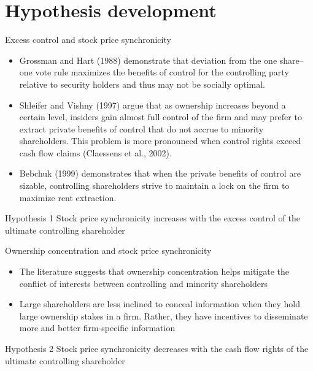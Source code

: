 \documentclass{beamer}
\begin{document}
\section{Hypothesis development}
\begin{frame}{Excess control and stock price synchronicity}
\begin{itemize}
	\scriptsize
	\item Grossman and Hart (1988) demonstrate that deviation from the
	one share–one vote rule maximizes the benefits of control for the
	controlling party relative to security holders and thus may not be
	socially optimal. 
	\item Shleifer and Vishny (1997) argue that as ownership increases beyond a certain level, insiders gain almost full control of the firm and may prefer to extract private benefits of control
	that do not accrue to minority shareholders. This problem is more
	pronounced when control rights exceed cash flow claims
	(Claessens et al., 2002). 
	\item Bebchuk (1999) demonstrates that when
	the private benefits of control are sizable, controlling shareholders strive to maintain a lock on the firm to maximize rent extraction.
\end{itemize}
\begin{block}{Hypothesis 1}
	Stock price synchronicity increases with the excess control of
	the ultimate controlling shareholder
\end{block}
\end{frame}

\begin{frame}{Ownership concentration and stock price synchronicity}
	\begin{itemize}
		\scriptsize
		\item The literature suggests that ownership concentration helps mitigate the conflict of interests between controlling and minority
		shareholders
		\item Large shareholders are less inclined to conceal information when they hold
		large ownership stakes in a firm. Rather, they have incentives to
		disseminate more and better firm-specific information
	\end{itemize}
\begin{block}{Hypothesis 2}
	Stock price synchronicity decreases with the cash flow rights
	of the ultimate controlling shareholder
\end{block}
\end{frame}
\end{document}
